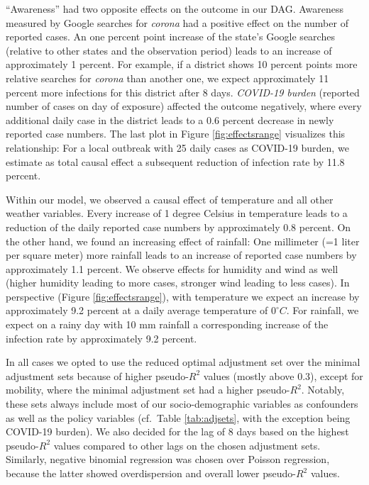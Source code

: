 \documentclass[]{elsarticle} %
\begin{document}
``Awareness'' had two opposite effects on the outcome in our DAG.
Awareness measured by Google searches for \emph{corona} had a positive
effect on the number of reported cases. An one percent point increase of
the state's Google searches (relative to other states and the
observation period) leads to an increase of approximately 1 percent. For
example, if a district shows 10 percent points more relative searches
for \emph{corona} than another one, we expect approximately 11 percent
more infections for this district after 8 days. \emph{COVID-19 burden}
(reported number of cases on day of exposure) affected the outcome
negatively, where every additional daily case in the district leads to a
0.6 percent decrease in newly reported case numbers. The last plot in
Figure \ref{fig:effectsrange} visualizes this relationship: For a local
outbreak with 25 daily cases as COVID-19 burden, we estimate as total
causal effect a subsequent reduction of infection rate by 11.8 percent.

Within our model, we observed a causal effect of temperature and all
other weather variables. Every increase of 1 degree Celsius in
temperature leads to a reduction of the daily reported case numbers by
approximately 0.8 percent. On the other hand, we found an increasing
effect of rainfall: One millimeter (=1 liter per square meter) more
rainfall leads to an increase of reported case numbers by approximately
1.1 percent. We observe effects for humidity and wind as well (higher
humidity leading to more cases, stronger wind leading to less cases). In
perspective (Figure \ref{fig:effectsrange}), with temperature we expect
an increase by approximately 9.2 percent at a daily average temperature
of \(0^{\circ}C\). For rainfall, we expect on a rainy day with 10 mm
rainfall a corresponding increase of the infection rate by approximately
9.2 percent.

In all cases we opted to use the reduced optimal adjustment set over the
minimal adjustment sets because of higher pseudo-\(R^2\) values (mostly
above 0.3), except for mobility, where the minimal adjustment set had a
higher pseudo-\(R^2\). Notably, these sets always include most of our
socio-demographic variables as confounders as well as the policy
variables (cf.~Table \ref{tab:adjsets}, with the exception being
COVID-19 burden). We also decided for the lag of 8 days based on the
highest pseudo-\(R^2\) values compared to other lags on the chosen
adjustment sets. Similarly, negative binomial regression was chosen over
Poisson regression, because the latter showed overdispersion and overall
lower pseudo-\(R^2\) values.
\end{document}
